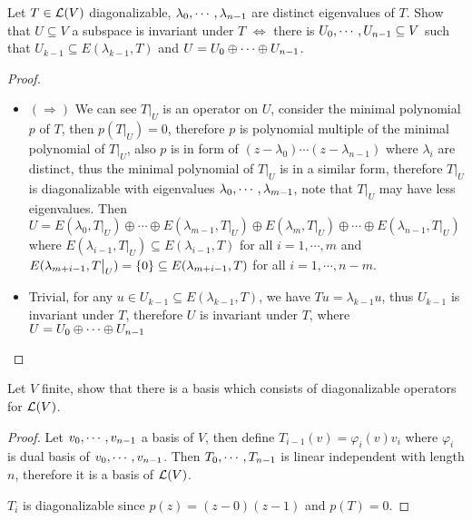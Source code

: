 \documentclass[../main.tex]{subfiles}
\begin{document}
\begin{exercise}
  Let $T \in \mathcal{L}(V)$ diagonalizable, $\lambda_0 , \cdots , \lambda_{n - 1}$ are distinct
  eigenvalues of $T$. Show that $U \subseteq V$ a subspace is invariant under $T$
  $\iff$ there is $U_0 , \cdots , U_{n - 1} \subseteq V$ such that $U_{k - 1} \subseteq E(\lambda_{k - 1}, T)$
  and $U = U_0 \oplus \cdots \oplus U_{n - 1}$.
\end{exercise}
\begin{proof}
  ~
  \begin{itemize}
    \item $(\Rightarrow)$ We can see $T\big|_U$ is an operator on $U$, consider the minimal polynomial $p$
          of $T$, then $p(T\big|_U) = 0$, therefore $p$ is polynomial multiple of the minimal polynomial of $T\big|_U$,
          also $p$ is in form of $(z - \lambda_0) \cdots (z - \lambda_{n - 1})$ where $\lambda_i$ are distinct,
          thus the minimal polynomial of $T\big|_U$ is in a similar form, therefore $T\big|_U$
          is diagonalizable with eigenvalues $\lambda_0 , \cdots , \lambda_{m - 1}$, note that $T\big|_U$ may have less eigenvalues.
          Then $U = E(\lambda_0, T\big|_U) \oplus \cdots \oplus E(\lambda_{m - 1}, T\big|_U) \oplus E(\lambda_m, T\big|_U) \oplus \cdots \oplus E(\lambda_{n - 1}, T\big|_U)$
          where $E(\lambda_{i - 1}, T\big|_U) \subseteq E(\lambda_{i - 1}, T)$ for all $i = 1, \cdots, m$
          and $E(\lambda_{m + i - 1}, T\big|_U) = \{0\} \subseteq E(\lambda_{m + i - 1}, T)$ for all $i = 1, \cdots, n - m$.
    \item Trivial, for any $u \in U_{k - 1} \subseteq E(\lambda_{k - 1}, T)$, we have $Tu = \lambda_{k - 1} u$,
          thus $U_{k - 1}$ is invariant under $T$, therefore $U$ is invariant under $T$,
          where $U = U_0 \oplus \cdots \oplus U_{n - 1}$
  \end{itemize}
\end{proof}

\begin{exercise}
  Let $V$ finite, show that there is a basis which consists of
  diagonalizable operators for $\mathcal{L}(V)$.
\end{exercise}
\begin{proof}
  Let $v_0 , \cdots , v_{n - 1}$ a basis of $V$, then
  define $T_{i - 1}(v) = \varphi_i(v)v_i$ where $\varphi_i$ is dual basis of $v_0 , \cdots , v_{n - 1}$.
  Then $T_0 , \cdots , T_{n - 1}$ is linear independent with length $n$,
  therefore it is a basis of $\mathcal{L}(V)$.

  $T_i$ is diagonalizable since $p(z) = (z - 0)(z - 1)$ and $p(T) = 0$.
\end{proof}
\end{document}

